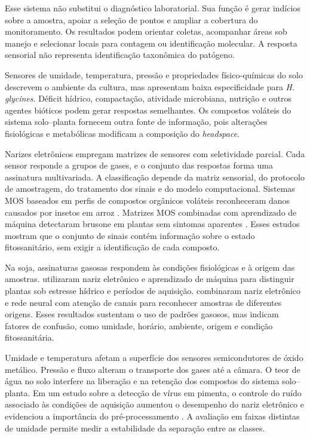 Esse sistema não substitui o diagnóstico laboratorial. Sua função é gerar indícios sobre a amostra, apoiar a seleção de pontos e ampliar a cobertura do monitoramento. Os resultados podem orientar coletas, acompanhar áreas sob manejo e selecionar locais para contagem ou identificação molecular. A resposta sensorial não representa identificação taxonômica do patógeno.

Sensores de umidade, temperatura, pressão e propriedades físico-químicas do solo descrevem o ambiente da cultura, mas apresentam baixa especificidade para \textit{H. glycines}. Déficit hídrico, compactação, atividade microbiana, nutrição e outros agentes bióticos podem gerar respostas semelhantes. Os compostos voláteis do sistema solo--planta fornecem outra fonte de informação, pois alterações fisiológicas e metabólicas modificam a composição do \textit{headspace}.

Narizes eletrônicos empregam matrizes de sensores com seletividade parcial. Cada sensor responde a grupos de gases, e o conjunto das respostas forma uma assinatura multivariada. A classificação depende da matriz sensorial, do protocolo de amostragem, do tratamento dos sinais e do modelo computacional. Sistemas MOS baseados em perfis de compostos orgânicos voláteis reconheceram danos causados por insetos em arroz \cite{li2025}. Matrizes MOS combinadas com aprendizado de máquina detectaram brusone em plantas sem sintomas aparentes \cite{wang2025}. Esses estudos mostram que o conjunto de sinais contém informação sobre o estado fitossanitário, sem exigir a identificação de cada composto.

Na soja, assinaturas gasosas respondem às condições fisiológicas e à origem das amostras.  utilizaram nariz eletrônico e aprendizado de máquina para distinguir plantas sob estresse hídrico e períodos de aquisição.  combinaram nariz eletrônico e rede neural com atenção de canais para reconhecer amostras de diferentes origens. Esses resultados sustentam o uso de padrões gasosos, mas indicam fatores de confusão, como umidade, horário, ambiente, origem e condição fitossanitária.

Umidade e temperatura afetam a superfície dos sensores semicondutores de óxido metálico. Pressão e fluxo alteram o transporte dos gases até a câmara. O teor de água no solo interfere na liberação e na retenção dos compostos do sistema solo--planta. Em um estudo sobre a detecção de vírus em pimenta, o controle do ruído associado às condições de aquisição aumentou o desempenho do nariz eletrônico e evidenciou a importância do pré-processamento \cite{agustika2025}. A avaliação em faixas distintas de umidade permite medir a estabilidade da separação entre as classes.

